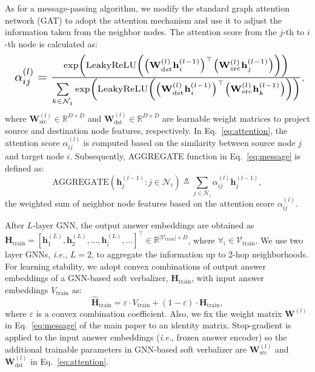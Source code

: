 \documentclass[10pt,twocolumn,letterpaper]{article}
\begin{document}
As for a message-passing algorithm, we modify the standard graph attention network (GAT) to adopt the attention mechanism and use it to adjust the information taken from the neighbor nodes.
The attention score from the $j$-th to $i$-th node is calculated as:
\begin{equation}
    \resizebox{1.0\hsize}{!}{
    $\alpha_{ij}^{(l)} = 
    \frac{\exp \left(\text{LeakyReLU}
    \left(\left({\mathbf{W}^{(l)}_\text{dst}}\mathbf{h}_i^{(l-1)}\right)^\top
    \left(\mathbf{W}^{(l)}_\text{src}\mathbf{h}_j^{(l-1)}\right)\right)\right)}
    {\sum\limits_{k \in \mathcal{N}_i}\exp \left(\text{LeakyReLU}
    \left(\left({\mathbf{W}^{(l)}_\text{dst}}\mathbf{h}_i^{(l-1)}\right)^\top
    \left(\mathbf{W}^{(l)}_\text{src}\mathbf{h}_k^{(l-1)}\right)\right)\right)}
    $},
    \label{eq:attention}
\end{equation}
where $\mathbf{W}^{(l)}_\text{src} \in \mathbb{R}^{D \times D}$ and $\mathbf{W}^{(l)}_\text{dst} \in \mathbb{R}^{D \times D}$ are learnable weight matrices to project source and destination node features, respectively.
In Eq.~\eqref{eq:attention}, the attention score $\alpha_{ij}^{(l)}$ is computed based on the similarity between source node $j$ and target node $i$.
Subsequently, AGGREGATE function in Eq.~\eqref{eq:message} is defined as:
\begin{equation}
    \text{AGGREGATE}\left(\mathbf{h}_j^{(l-1)}: j \in \mathcal{N}_i\right) \triangleq \sum_{j \in \mathcal{N}_i} \alpha_{ij}^{(l)} \mathbf{h}_j^{(l-1)},
    \label{eq:aggregate}
\end{equation}
the weighted sum of neighbor node features based on the attention score $\alpha_{ij}^{(l)}$.

After $L$-layer GNN, the output answer embeddings are obtained as $\mathbf{H}_\text{train} = [\mathbf{h}_1^{(L)}, \mathbf{h}_2^{(L)}, \dots, \mathbf{h}_i^{(L)}, \dots]^\top \in \mathbb{R}^{|\mathcal{V}_\text{train}| \times D}$, where $\forall_i \in \mathcal{V}_\text{train}$.
We use two layer GNNs, \textit{i.e.}, $L = 2$, to aggregate the information up to 2-hop neighborhoods.
For learning stability, we adopt convex combinations of output answer embeddings of a GNN-based soft verbalizer, $\mathbf{H}_\text{train}$, with input answer embeddings $V_\text{train}$ as:
\begin{equation}
    \hat{\mathbf{H}}_\text{train} = \varepsilon \cdot V_\text{train} + (1 - \varepsilon) \cdot \mathbf{H}_\text{train},
    \label{eq:epsilon}
\end{equation}
where $\varepsilon$ is a convex combination coefficient.
Also, we fix the weight matrix $\mathbf{W}^{(l)}$ in Eq.~\eqref{eq:message} of the main paper to an identity matrix.
Stop-gradient is applied to the input answer embeddings (\textit{i.e.}, frozen answer encoder) so the additional trainable parameters in GNN-based soft verbalizer are $\mathbf{W}^{(l)}_\text{src}$ and $\mathbf{W}^{(l)}_\text{dst}$ in Eq.~\eqref{eq:attention}.
\end{document}
